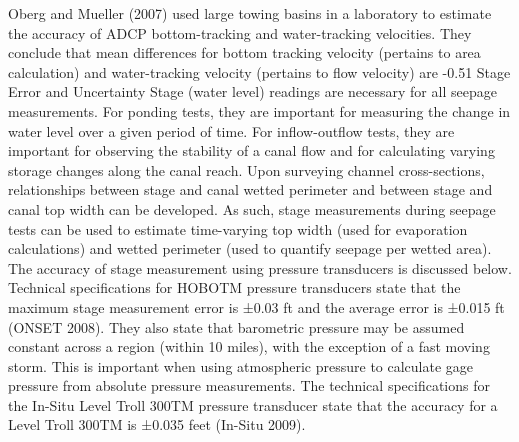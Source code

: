 \begin{linenumbers}
Oberg and Mueller (2007) used large towing basins in a laboratory to estimate the accuracy of ADCP bottom-tracking and water-tracking velocities.  They conclude that mean differences for bottom tracking velocity (pertains to area calculation) and water-tracking velocity (pertains to flow velocity) are -0.51%
Stage Error and Uncertainty
Stage (water level) readings are necessary for all seepage measurements.  For ponding tests, they are important for measuring the change in water level over a given period of time.  For inflow-outflow tests, they are important for observing the stability of a canal flow and for calculating varying storage changes along the canal reach.  Upon surveying channel cross-sections, relationships between stage and canal wetted perimeter and between stage and canal top width can be developed.  As such, stage measurements during seepage tests can be used to estimate time-varying top width (used for evaporation calculations) and wetted perimeter (used to quantify seepage per wetted area).  The accuracy of stage measurement using pressure transducers is discussed below.
Technical specifications for HOBOTM pressure transducers state that the maximum stage measurement error is ±0.03 ft and the average error is ±0.015 ft (ONSET 2008).  They also state that barometric pressure may be assumed constant across a region (within 10 miles), with the exception of a fast moving storm.  This is important when using atmospheric pressure to calculate gage pressure from absolute pressure measurements.
The technical specifications for the In-Situ Level Troll 300TM pressure transducer state that the accuracy for a Level Troll 300TM is ±0.035 feet (In-Situ 2009).

\end{linenumbers}
